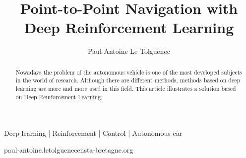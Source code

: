 \documentclass[times, twoside, watermark]{style}
\begin{document}
\title{Point-to-Point Navigation with Deep Reinforcement Learning }

\author[1,\Letter]{ Paul-Antoine Le Tolguenec}


\maketitle

\begin{abstract}
    Nowadays the problem of the autonomous vehicle is one of the most developed subjects in the world of research. 
    Although there are different methods, methods based on deep learning are more and more used in this field. 
    This article illustrates a solution based on Deep Reinforcement Learning.
\end {abstract}

\begin{keywords}
Deep learning | Reinforcement | Control | Autonomous car
\end{keywords}

\begin{corrauthor}
paul-antoine.le\textunderscore tolguenec\at ensta-bretagne.org
\end{corrauthor}

\maketitle









%

%

%

%

\end{document}
